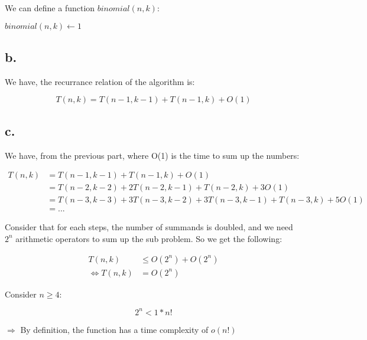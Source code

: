 \documentclass{article}
\begin{document}
We can define a function  $binomial(n, k)$:\\

\begin{algorithm}
\caption{$binomial(n, k)$}\label{alg:cap}
\begin{algorithmic}
    \State $binomial(n, k) \gets 1$
\Else 
\EndIf 
\end{algorithmic}
\end{algorithm}


\pagebreak
\subsection*{b.}
We have, the recurrance relation of the algorithm is:

\[
T(n, k) = T(n - 1, k - 1) + T(n - 1, k) + O(1)
\]


\pagebreak
\subsection*{c.}
We have, from the previous part, where O(1) is the time to sum up the numbers:

\begin{align}
T(n, k) &= T(n - 1, k - 1) + T(n - 1, k) + O(1)                                                       \\
           &= T(n - 2, k - 2) + 2T(n - 2, k - 1) + T(n - 2, k) + 3O(1)                           \\
           &= T(n - 3, k - 3) + 3T(n - 3, k - 2) + 3T(n - 3, k - 1) + T(n - 3, k) + 5O(1) \\
           &= ...
\end{align}

Consider that for each steps, the number of summands is doubled, and we need $2^n$ arithmetic operators to sum up the sub problem. So we get the following:
 
\begin{align}
T(n, k) &\leq O(2^n) + O(2^n) \\
\Leftrightarrow T(n, k) &= O(2^n)  
\end{align}

Consider $n \geq 4$:


\[
2^n < 1 * n!
\]

$\Rightarrow$ By definition, the function has a time complexity of $o(n!)$
\end{document}
